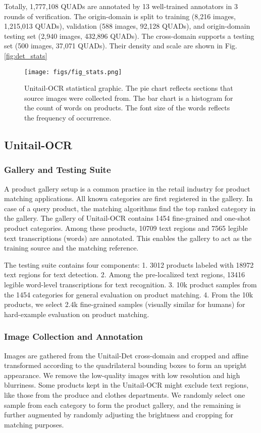 \documentclass[runningheads]{llncs}
\begin{document}
Totally, 1,777,108 QUADs are annotated by 13 well-trained annotators in 3 rounds of verification. The origin-domain is split to training (8,216 images, 1,215,013 QUADs), validation (588 images, 92,128 QUADs), and origin-domain testing set (2,940 images, 432,896 QUADs). The cross-domain supports a testing set (500 images, 37,071 QUADs). Their density and scale are shown in Fig.\ref{fig:det_stats}

\begin{SCfigure}
    \centering
    \texttt{[image: figs/fig\_stats.png]}
    \caption{Unitail-OCR statistical graphic. The pie chart reflects sections that source images were collected from. The bar chart is a histogram for the count of words on products. The font size of the words reflects the frequency of occurrence.}
    \label{fig:ocr_stats}
\end{SCfigure}

\subsection{Unitail-OCR}

\subsubsection{Gallery and Testing Suite}
A product gallery setup is a common practice in the retail industry for product matching applications. All known categories are first registered in the gallery. In case of a query product, the matching algorithms find the top ranked category in the gallery. 
The gallery of Unitail-OCR contains 1454 fine-grained and one-shot product categories. Among these products, 10709 text regions and 7565 legible text transcriptions (words) are annotated. This enables the gallery to act as the training source and the matching reference.

The testing suite contains four components: 1. 3012 products labeled with 18972 text regions for text detection. 2. Among the pre-localized text regions, 13416 legible word-level transcriptions for text recognition. 3. 10k product samples from the 1454 categories for general evaluation on product matching. 4. From the 10k products, we select 2.4k fine-grained samples (visually similar for humans) for hard-example evaluation on product matching.

\subsubsection{Image Collection and Annotation} 
Images are gathered from the Unitail-Det cross-domain and cropped and affine transformed according to the quadrilateral bounding boxes to form an upright appearance. We remove the low-quality images with low resolution and high blurriness. Some products kept in the Unitail-OCR might exclude text regions, like those from the produce and clothes departments. We randomly select one sample from each category to form the product gallery, and the remaining is further augmented by randomly adjusting the brightness and cropping for matching purposes. 
\end{document}
